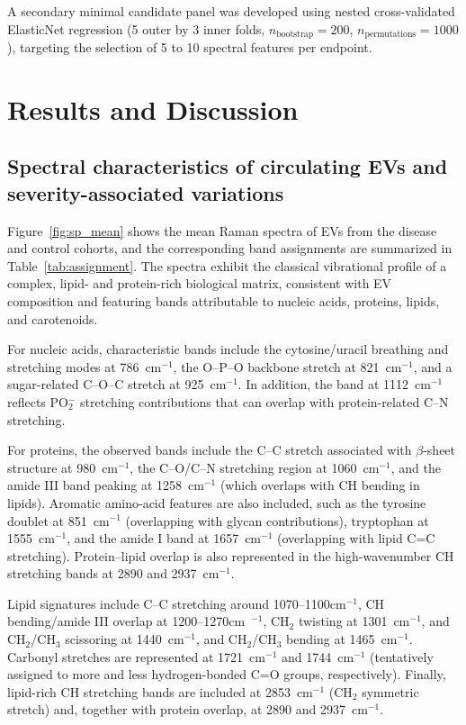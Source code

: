\documentclass[preprint,12pt]{elsarticle}
\begin{document}
A secondary minimal candidate panel was developed using nested cross-validated ElasticNet regression (5 outer by 3 inner folds, $n_{\text{bootstrap}} = 200$, $n_{\text{permutations}} = 1000$), targeting the selection of 5 to 10 spectral features per endpoint.

\color{black}


\section{Results and Discussion}
\subsection{Spectral characteristics of circulating EVs and severity-associated variations}
\label{subsec:spectral_profiles}

Figure~\ref{fig:sp_mean} shows the mean Raman spectra of EVs from the disease and control cohorts, and the corresponding band assignments are summarized in Table~\ref{tab:assignment}. The spectra exhibit the classical vibrational profile of a complex, lipid- and protein-rich biological matrix, consistent with EV composition and featuring bands attributable to nucleic acids, proteins, lipids, and carotenoids.

For nucleic acids, characteristic bands include the cytosine/uracil breathing and stretching modes at 786~cm$^{-1}$, the O--P--O backbone stretch at 821~cm$^{-1}$, and a sugar-related C--O--C stretch at 925~cm$^{-1}$. In addition, the band at 1112~cm$^{-1}$ reflects PO$_2^-$ stretching contributions that can overlap with protein-related C--N stretching.

For proteins, the observed bands include the C--C stretch associated with $\beta$-sheet structure at 980~cm$^{-1}$, the C--O/C--N stretching region at 1060~cm$^{-1}$, and the amide III band peaking at 1258~cm$^{-1}$ (which overlaps with CH bending in lipids). Aromatic amino-acid features are also included, such as the tyrosine doublet at 851~cm$^{-1}$ (overlapping with glycan contributions), tryptophan at 1555~cm$^{-1}$, and the amide I band at 1657~cm$^{-1}$ (overlapping with lipid C=C stretching). Protein–lipid overlap is also represented in the high-wavenumber CH stretching bands at 2890 and 2937~cm$^{-1}$.

Lipid signatures include C--C stretching around 1070--1100cm$^{-1}$, CH bending/amide III overlap at 1200--1270cm~$^{-1}$, CH$_2$ twisting at 1301~cm$^{-1}$, and CH$_2$/CH$_3$ scissoring at 1440~cm$^{-1}$, and CH$_2$/CH$_3$ bending at 1465~cm$^{-1}$. Carbonyl stretches are represented at 1721~cm$^{-1}$ and 1744~cm$^{-1}$ (tentatively assigned to more and less hydrogen-bonded C=O groups, respectively). Finally, lipid-rich CH stretching bands are included at 2853~cm$^{-1}$ (CH$_2$ symmetric stretch) and, together with protein overlap, at 2890 and 2937~cm$^{-1}$.
\end{document}

